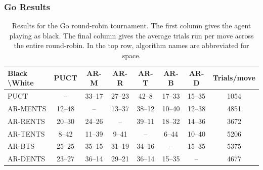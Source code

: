 \subsubsection{Go Results}
\label{sec:4-4-3-3-go_results}

    \begin{table}[tbp]
    \centering   
            {%
            \setlength{\tabcolsep}{4pt}%
            \fontsize{12}{14.5}\selectfont
        \begin{tabular}{l|cccccc|c} 
            \textbf{Black \textbackslash White}     & PUCT  & AR-M  & AR-R  & AR-T  & AR-B  & AR-D   & Trials/move\\ 
            \hline
                PUCT            &   --   & 33--17 & 27--23 & 42--8  & 17--33 & 15--35  & 1054 \\
                AR-MENTS        & 12--48 &   --   & 13--37 & 38--12 & 10--40 & 12--38  & 4851\\
                AR-RENTS        & 20--30 & 24--26 &   --   & 39--11 & 18--32 & 14--36  & 3672 \\
                AR-TENTS        &  8--42 & 11--39 &  9--41 &   --   &  6--44 & 10--40  & 5206 \\
                AR-BTS          & 25--25 & 35--15 & 31--19 & 34--16 &   --   & 15--35  & 5375 \\
                AR-DENTS        & 23--27 & 36--14 & 29--21 & 36--14 & 15--35 &   --    & 4677 \\         
        \end{tabular}
            }
        \caption[Results for the Go round-robin tournament.]{Results for the Go round-robin tournament. The first column gives the agent playing as black. The final column gives the average trials run per move across the entire round-robin. In the top row, algorithm names are abbreviated for space.}
        \label{table:go_results}
    \end{table}

